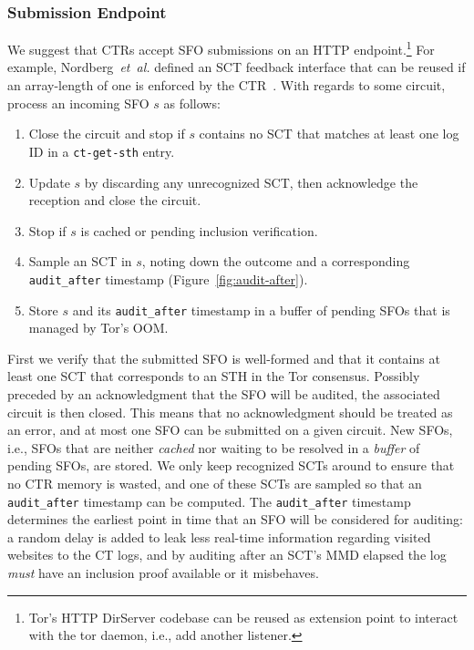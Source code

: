 \subsubsection{Submission Endpoint} \label{sec:design:api}
We suggest that CTRs accept SFO submissions on an HTTP endpoint.\footnote{%
	Tor's HTTP DirServer codebase can be reused as extension point to interact
	with the tor daemon, i.e., add another listener.
} For example, Nordberg~\emph{et~al.} defined an SCT feedback interface that can
be reused if an array-length of one is enforced by the CTR~\cite{nordberg}.
With regards to some circuit, process an incoming SFO $s$ as follows:
\begin{enumerate}
	\item\label{enm:ctr-api:well-formed} Close the circuit and stop if $s$
		contains no SCT that matches at least one log ID in a
	\texttt{ct-get-sth} entry.
	\item\label{enm:ctr-api:ack} Update $s$ by discarding any
		unrecognized SCT, %
		then acknowledge the reception and close the circuit.
	\item\label{enm:ctr-api:cached}
		Stop if $s$ is cached or pending inclusion verification.
	\item\label{enm:ctr-api:audit-after} Sample an SCT in $s$, noting down the
		outcome and a corresponding \texttt{audit\_after} timestamp
		(Figure~\ref{fig:audit-after}).
	\item\label{enm:ctr-api:store} Store $s$ and its \texttt{audit\_after}
		timestamp in a buffer of pending SFOs that is managed by Tor's OOM.
\end{enumerate}

First we verify that the submitted SFO is well-formed and that it contains at
least one SCT that corresponds to an STH in the Tor consensus.
Possibly preceded by an acknowledgment that the SFO will be audited, the
associated circuit is then closed.  This means that no acknowledgment should be
treated as an error, and at most one SFO can be submitted on a given circuit.
New SFOs, i.e., SFOs that are neither \emph{cached} nor waiting to be resolved
in a \emph{buffer} of pending SFOs, are stored.  We only keep recognized
SCTs around to ensure that no CTR memory is wasted, and one of these SCTs are
sampled so that an \texttt{audit\_after} timestamp can be computed.  The
\texttt{audit\_after} timestamp determines the earliest point in time that an
SFO will be considered for auditing:
	a random delay is added to leak less real-time information regarding visited
		websites to the CT logs, and
	by auditing after an SCT's MMD elapsed the log \emph{must} have an
		inclusion proof available or it misbehaves.

